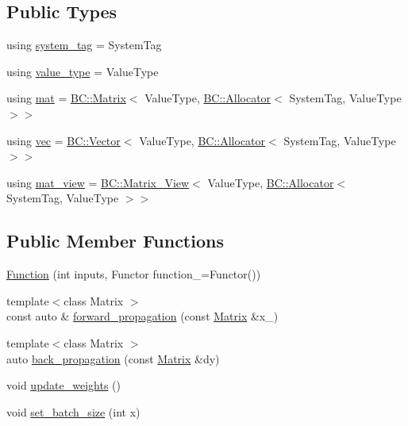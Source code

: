 \subsection*{Public Types}
\begin{DoxyCompactItemize}
\item 
using \hyperlink{classBC_1_1nn_1_1Function_a53b53a2a2a9f335e5ac57d8d38ef9331}{system\+\_\+tag} = System\+Tag
\item 
using \hyperlink{classBC_1_1nn_1_1Function_a38613d0bc4a6ea946592925c1ce15148}{value\+\_\+type} = Value\+Type
\item 
using \hyperlink{classBC_1_1nn_1_1Function_a3b600b13f8145a475fceeead09ccf827}{mat} = \hyperlink{namespaceBC_1_1tensors_1_1common__using_a6fc3153d379a42b1a97df46ed5b71a29}{B\+C\+::\+Matrix}$<$ Value\+Type, \hyperlink{namespaceBC_a934f94b17b06290e6b241e5f59930c5f}{B\+C\+::\+Allocator}$<$ System\+Tag, Value\+Type $>$$>$
\item 
using \hyperlink{classBC_1_1nn_1_1Function_a6518bb1857280656abf74d7d4e9cc164}{vec} = \hyperlink{namespaceBC_1_1tensors_1_1common__using_ab2d6784064c0dda8aef3c2a9177ffa77}{B\+C\+::\+Vector}$<$ Value\+Type, \hyperlink{namespaceBC_a934f94b17b06290e6b241e5f59930c5f}{B\+C\+::\+Allocator}$<$ System\+Tag, Value\+Type $>$$>$
\item 
using \hyperlink{classBC_1_1nn_1_1Function_ac1e30031ee79cf0839d104cf85db3419}{mat\+\_\+view} = \hyperlink{namespaceBC_1_1tensors_1_1common__using_a2ef3cf5721d0ae966c30051cbe6f24b6}{B\+C\+::\+Matrix\+\_\+\+View}$<$ Value\+Type, \hyperlink{namespaceBC_a934f94b17b06290e6b241e5f59930c5f}{B\+C\+::\+Allocator}$<$ System\+Tag, Value\+Type $>$$>$
\end{DoxyCompactItemize}
\subsection*{Public Member Functions}
\begin{DoxyCompactItemize}
\item 
\hyperlink{classBC_1_1nn_1_1Function_a05bee8e8cb52f9f9b6a6641ac08317f0}{Function} (int inputs, Functor function\+\_\+=Functor())
\item 
{\footnotesize template$<$class Matrix $>$ }\\const auto \& \hyperlink{classBC_1_1nn_1_1Function_a587b7190d19bbd367b746db5411db321}{forward\+\_\+propagation} (const \hyperlink{namespaceBC_1_1tensors_1_1common__using_a6fc3153d379a42b1a97df46ed5b71a29}{Matrix} \&x\+\_\+)
\item 
{\footnotesize template$<$class Matrix $>$ }\\auto \hyperlink{classBC_1_1nn_1_1Function_a257f24c8f52fc4082070355655638a3a}{back\+\_\+propagation} (const \hyperlink{namespaceBC_1_1tensors_1_1common__using_a6fc3153d379a42b1a97df46ed5b71a29}{Matrix} \&dy)
\item 
void \hyperlink{classBC_1_1nn_1_1Function_aa7e88e30051b96615985e52952481db4}{update\+\_\+weights} ()
\item 
void \hyperlink{classBC_1_1nn_1_1Function_a906c38a34166f0d91ad9eaa5cad09384}{set\+\_\+batch\+\_\+size} (int x)
\end{DoxyCompactItemize}
